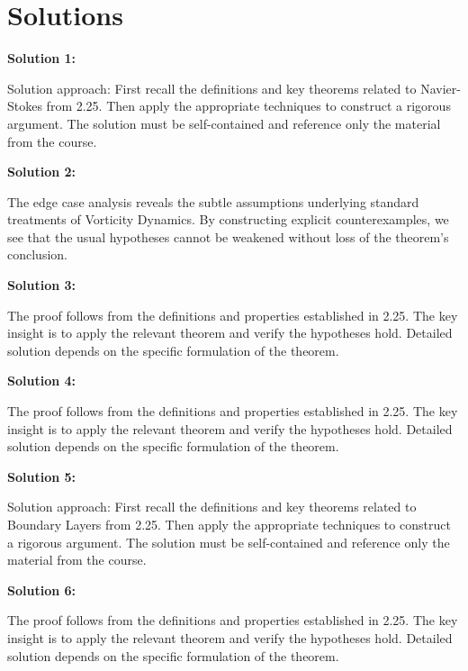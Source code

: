 \documentclass[12pt,a4paper]{exam}
\begin{document}
\newpage
\section*{Solutions}

\textbf{Solution 1:}

Solution approach: First recall the definitions and key theorems related to Navier-Stokes from 2.25. Then apply the appropriate techniques to construct a rigorous argument. The solution must be self-contained and reference only the material from the course.

\vspace{0.5cm}

\textbf{Solution 2:}

The edge case analysis reveals the subtle assumptions underlying standard treatments of Vorticity Dynamics. By constructing explicit counterexamples, we see that the usual hypotheses cannot be weakened without loss of the theorem's conclusion.

\vspace{0.5cm}

\textbf{Solution 3:}

The proof follows from the definitions and properties established in 2.25. The key insight is to apply the relevant theorem and verify the hypotheses hold. Detailed solution depends on the specific formulation of the theorem.

\vspace{0.5cm}

\textbf{Solution 4:}

The proof follows from the definitions and properties established in 2.25. The key insight is to apply the relevant theorem and verify the hypotheses hold. Detailed solution depends on the specific formulation of the theorem.

\vspace{0.5cm}

\textbf{Solution 5:}

Solution approach: First recall the definitions and key theorems related to Boundary Layers from 2.25. Then apply the appropriate techniques to construct a rigorous argument. The solution must be self-contained and reference only the material from the course.

\vspace{0.5cm}

\textbf{Solution 6:}

The proof follows from the definitions and properties established in 2.25. The key insight is to apply the relevant theorem and verify the hypotheses hold. Detailed solution depends on the specific formulation of the theorem.
\end{document}
